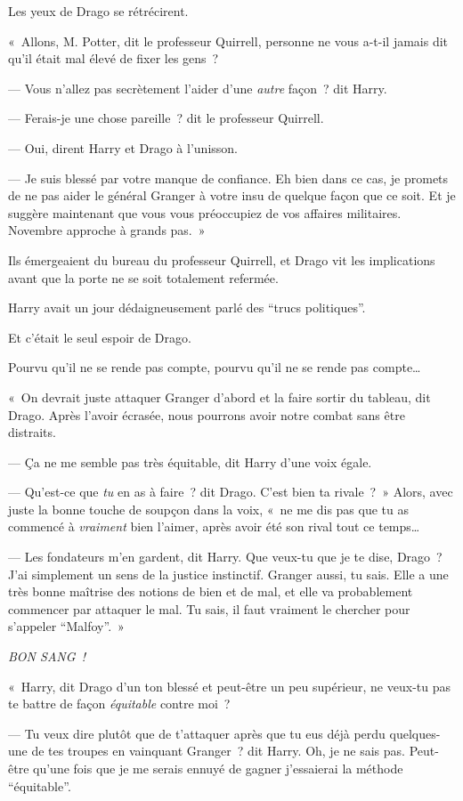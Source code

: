 Les yeux de Drago se rétrécirent.

«~Allons, M. Potter, dit le professeur Quirrell, personne ne vous a-t-il jamais dit qu'il était mal élevé de fixer les gens~?

--- Vous n'allez pas secrètement l'aider d'une \emph{autre} façon~? dit Harry.

--- Ferais-je une chose pareille~? dit le professeur Quirrell.

--- Oui, dirent Harry et Drago à l'unisson.

--- Je suis blessé par votre manque de confiance. Eh bien dans ce cas, je promets de ne pas aider le général Granger à votre insu de quelque façon que ce soit. Et je suggère maintenant que vous vous préoccupiez de vos affaires militaires. Novembre approche à grands pas.~»

\later

Ils émergeaient du bureau du professeur Quirrell, et Drago vit les implications avant que la porte ne se soit totalement refermée.

Harry avait un jour dédaigneusement parlé des “trucs politiques”.

Et c'était le seul espoir de Drago.

Pourvu qu'il ne se rende pas compte, pourvu qu'il ne se rende pas compte…

«~On devrait juste attaquer Granger d'abord et la faire sortir du tableau, dit Drago. Après l'avoir écrasée, nous pourrons avoir notre combat sans être distraits.

--- Ça ne me semble pas très équitable, dit Harry d'une voix égale.

--- Qu'est-ce que \emph{tu} en as à faire~? dit Drago. C'est bien ta rivale~?~» Alors, avec juste la bonne touche de soupçon dans la voix, «~ne me dis pas que tu as commencé à \emph{vraiment} bien l'aimer, après avoir été son rival tout ce temps…

--- Les fondateurs m'en gardent, dit Harry. Que veux-tu que je te dise, Drago~? J'ai simplement un sens de la justice instinctif. Granger aussi, tu sais. Elle a une très bonne maîtrise des notions de bien et de mal, et elle va probablement commencer par attaquer le mal. Tu sais, il faut vraiment le chercher pour s'appeler “Malfoy”.~»

\emph{BON SANG~!}

«~Harry, dit Drago d'un ton blessé et peut-être un peu supérieur, ne veux-tu pas te battre de façon \emph{équitable} contre moi~?

--- Tu veux dire plutôt que de t'attaquer après que tu eus déjà perdu quelques-une de tes troupes en vainquant Granger~? dit Harry. Oh, je ne sais pas. Peut-être qu'une fois que je me serais ennuyé de gagner j'essaierai la méthode “équitable”.

